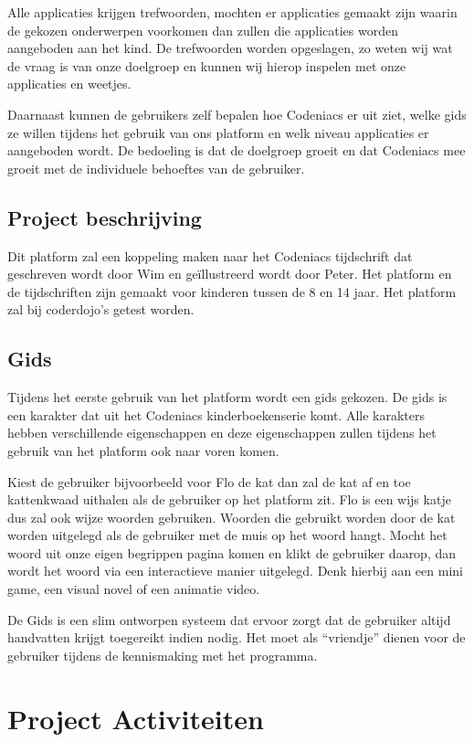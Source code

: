 \documentclass[]{report}
\begin{document}
Alle applicaties krijgen trefwoorden, mochten er applicaties gemaakt zijn waarin de gekozen onderwerpen voorkomen dan zullen die applicaties worden aangeboden aan het kind. De trefwoorden worden opgeslagen, zo weten wij wat de vraag is van onze doelgroep en kunnen wij hierop inspelen met onze applicaties en weetjes.

Daarnaast kunnen de gebruikers zelf bepalen hoe Codeniacs er uit ziet, welke gids ze willen tijdens het gebruik van ons platform en welk niveau applicaties er aangeboden wordt. De bedoeling is dat de doelgroep groeit en dat Codeniacs mee groeit met de individuele behoeftes van de gebruiker.


\section{Project beschrijving}
Dit platform zal een koppeling maken naar het Codeniacs tijdschrift dat geschreven wordt door Wim en geïllustreerd wordt door Peter. Het platform en de tijdschriften zijn gemaakt voor kinderen tussen de 8 en 14 jaar. Het platform zal bij coderdojo's getest worden.

\section{Gids}
Tijdens het eerste gebruik van het platform wordt een gids gekozen. De gids is een karakter dat uit het Codeniacs kinderboekenserie komt. Alle karakters hebben verschillende eigenschappen en deze eigenschappen zullen tijdens het gebruik van het platform ook naar voren komen.

Kiest de gebruiker bijvoorbeeld voor Flo de kat dan zal de kat af en toe kattenkwaad uithalen als de gebruiker op het platform zit. Flo is een wijs katje dus zal ook wijze woorden gebruiken. Woorden die gebruikt worden door de kat worden uitgelegd als de gebruiker met de muis op het woord hangt. Mocht het woord uit onze eigen begrippen pagina komen en klikt de gebruiker daarop, dan wordt het woord via een interactieve manier uitgelegd. Denk hierbij aan een mini game, een visual novel of een animatie video.

De Gids is een slim ontworpen systeem dat ervoor zorgt dat de gebruiker altijd handvatten krijgt toegereikt indien nodig. Het moet als “vriendje” dienen voor de gebruiker tijdens de kennismaking met het programma. 




\chapter{Project Activiteiten}
\end{document}
